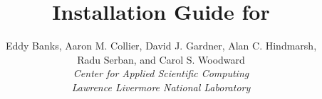\documentclass[twoside,openright,10pt]{report}
\title{Installation Guide for {\sundials} {\sunrelease}}
\author{
  Eddy Banks, Aaron M. Collier, David J. Gardner, Alan C. Hindmarsh,\\Radu Serban, and Carol S. Woodward\\
  {\em Center for Applied Scientific Computing} \\
  {\em Lawrence Livermore National Laboratory}
}
\date{
  \today 
  \vfill {\centerline{\texttt{[image: doc\_logo\_blue]}}}
  \vfill \kinucrlug
}
\begin{document}
\frontex


\clearemptydoublepage
\end{document}
